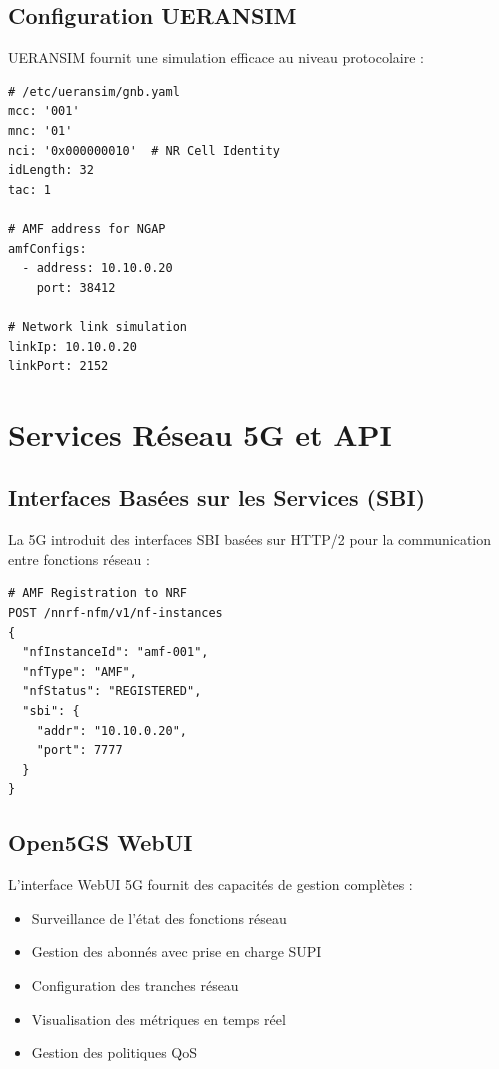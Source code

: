 \documentclass[12pt,a4paper]{report}
\begin{document}
\subsection{Configuration UERANSIM}

UERANSIM fournit une simulation efficace au niveau protocolaire :

\begin{lstlisting}[caption=UERANSIM gNB Configuration]
# /etc/ueransim/gnb.yaml
mcc: '001'
mnc: '01'
nci: '0x000000010'  # NR Cell Identity
idLength: 32
tac: 1

# AMF address for NGAP
amfConfigs:
  - address: 10.10.0.20
    port: 38412

# Network link simulation
linkIp: 10.10.0.20
linkPort: 2152
\end{lstlisting}

\section{Services Réseau 5G et API}

\subsection{Interfaces Basées sur les Services (SBI)}

La 5G introduit des interfaces SBI basées sur HTTP/2 pour la communication entre fonctions réseau :

\begin{lstlisting}[caption=Exemple d'API SBI]
# AMF Registration to NRF
POST /nnrf-nfm/v1/nf-instances
{
  "nfInstanceId": "amf-001",
  "nfType": "AMF",
  "nfStatus": "REGISTERED",
  "sbi": {
    "addr": "10.10.0.20",
    "port": 7777
  }
}
\end{lstlisting}

\subsection{Open5GS WebUI}

L'interface WebUI 5G fournit des capacités de gestion complètes :

\begin{itemize}
    \item Surveillance de l'état des fonctions réseau
    \item Gestion des abonnés avec prise en charge SUPI
    \item Configuration des tranches réseau
    \item Visualisation des métriques en temps réel
    \item Gestion des politiques QoS
\end{itemize}
\end{document}
